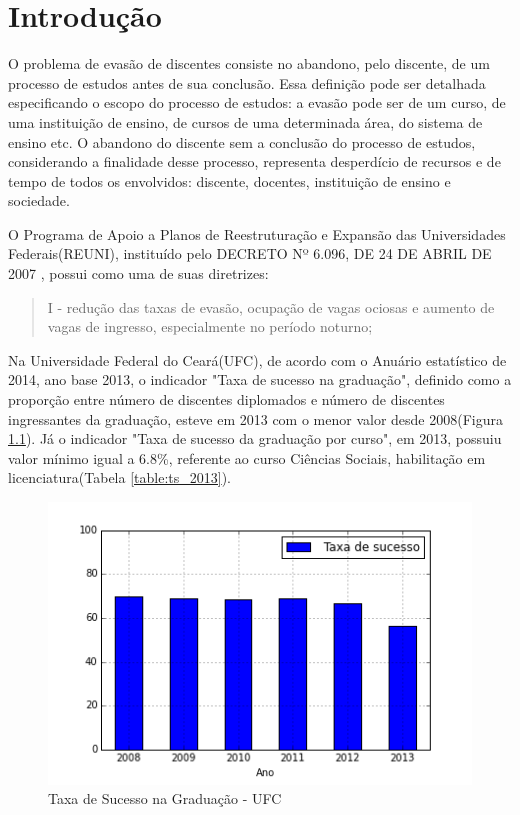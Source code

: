 \chapter{Introdução}


O problema de evasão de discentes consiste no abandono, pelo discente, de um processo de estudos antes de sua conclusão. Essa definição pode ser detalhada especificando o escopo do processo de estudos: a evasão pode ser de um curso, de uma instituição de ensino, de cursos de uma determinada área, do sistema de ensino etc. O abandono do discente sem a conclusão do processo de estudos, considerando a finalidade desse processo, representa desperdício de recursos e de tempo de todos os envolvidos: discente, docentes, instituição de ensino e sociedade.


O Programa de Apoio a Planos de Reestruturação e Expansão das Universidades Federais(REUNI), instituído pelo DECRETO Nº 6.096, DE 24 DE ABRIL DE 2007 , possui como uma de suas diretrizes:

\begin{quote}
I - redução das taxas de evasão, ocupação de vagas ociosas e aumento de vagas de ingresso, especialmente no período noturno;
\end{quote}


Na Universidade Federal do Ceará(UFC), de acordo com o Anuário estatístico de 2014, ano base 2013, o indicador "Taxa de sucesso na graduação", definido como a proporção entre número de discentes diplomados e número de discentes ingressantes da graduação, esteve em 2013 com o menor valor desde 2008(Figura \ref{img:taxa-de-sucesso-ufc}). Já o indicador "Taxa de sucesso da graduação por curso", em 2013, possuiu valor mínimo igual a 6.8\%, referente ao curso Ciências Sociais, habilitação em licenciatura(Tabela \ref{table:ts_2013}).

\begin{figure}[H]
	\includegraphics[scale=0.8]{img/taxa-de-sucesso-ufc.png}
	\caption{Taxa de Sucesso na Graduação - UFC}
	\label{img:taxa-de-sucesso-ufc}
\end{figure}

